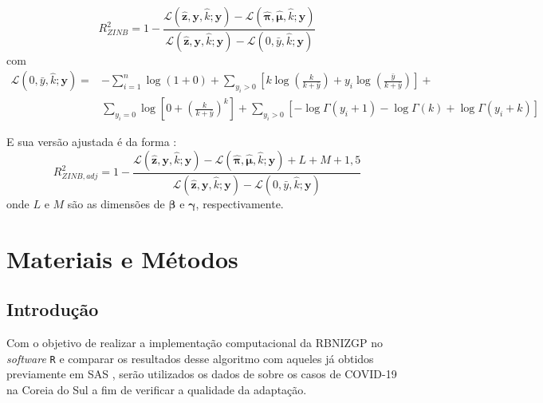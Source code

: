 \documentclass[12pt, a4paper, twoside]{report}
\numberwithin{equation}{section} %
\begin{document}
\begin{equation}
    R_{Z I N B}^2=1-\frac{\mathcal{L}(\hat{\boldsymbol{z}}, \boldsymbol{y}, \hat{k} ; \boldsymbol{y})-\mathcal{L}(\hat{\boldsymbol{\pi}}, \hat{\boldsymbol{\mu}}, \hat{k} ; \boldsymbol{y})}{\mathcal{L}(\hat{\boldsymbol{z}}, \boldsymbol{y}, \hat{k} ; \boldsymbol{y})-\mathcal{L}(0, \bar{y}, \hat{k} ; \boldsymbol{y})}
\end{equation}
com
\begin{equation}
    \begin{aligned}
\mathcal{L}(0, \bar{y}, \hat{k} ; \boldsymbol{y})= & -\sum_{i=1}^n \log (1+0)+\sum_{y_i>0}\left[k \log \left(\frac{k}{k+\bar{y}}\right)+y_i \log \left(\frac{\bar{y}}{k+\bar{y}}\right)\right]+ \\
& \sum_{y_i=0} \log \left[0+\left(\frac{k}{k+\bar{y}}\right)^k\right]+\sum_{y_i>0}\left[-\log \Gamma\left(y_i+1\right)-\log \Gamma(k)+\log \Gamma\left(y_i+k\right)\right]
\end{aligned}
\end{equation}

E sua versão ajustada é da forma \citep{martin2016}:
\begin{equation}
    R_{Z I N B, a d j}^2=1-\frac{\mathcal{L}(\hat{\boldsymbol{z}}, \boldsymbol{y}, \hat{k} ; \boldsymbol{y})-\mathcal{L}(\hat{\boldsymbol{\pi}}, \hat{\boldsymbol{\mu}}, \hat{k} ; \boldsymbol{y})+L+M+1,5}{\mathcal{L}(\hat{\boldsymbol{z}}, \boldsymbol{y}, \hat{k} ; \boldsymbol{y})-\mathcal{L}(0, \bar{y}, \hat{k} ; \boldsymbol{y})}
\end{equation}
onde $L$ e $M$ são as dimensões de $\boldsymbol{\beta}$ e $\boldsymbol{\gamma}$, respectivamente.

\chapter{Materiais e Métodos}

\section{Introdução}

Com o objetivo de realizar a implementação computacional da RBNIZGP no \textit{software} \texttt{R} e comparar os resultados desse algoritmo com aqueles já obtidos previamente em SAS \citep{dasilva2023}, serão utilizados os dados  de \cite{weinstein2021precision} sobre os casos de COVID-19 na Coreia do Sul a fim de verificar a qualidade da adaptação. 

\end{document}
